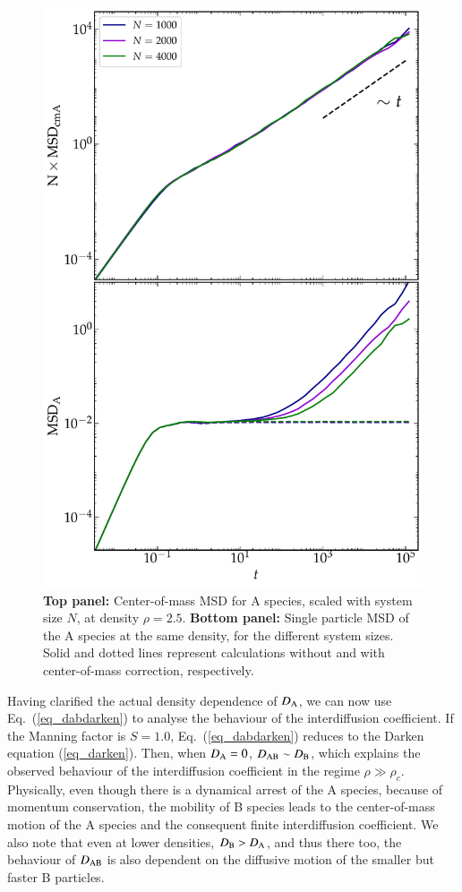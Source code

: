 %
\begin{figure}
\centering
\includegraphics[width=13cm]{figs/fig6p7.pdf}
\caption[{\em Center-of-mass MSD for A species, scaled with system size and single particle MSD of the A species at the same density, for the different system sizes}]{{\bf Top panel:} Center-of-mass MSD for A species, scaled with system size $N$, at density $\rho=2.5$. {\bf Bottom panel:}  Single particle MSD of the A species at the same density, for the different system sizes. Solid and dotted lines represent calculations without and with center-of-mass correction, respectively.
\label{fig6p7}}
\end{figure}
%

Having clarified the actual density dependence of $D_{\rm A}$, we can now use Eq.~(\ref{eq_dabdarken}) to analyse the behaviour of the interdiffusion coefficient. If the Manning factor is $S=1.0$, Eq.~(\ref{eq_dabdarken}) reduces to the Darken equation (\ref{eq_darken}). Then, when $D_{\rm A}=0$, $D_{\rm AB} \sim D_{\rm B}$, which explains the observed behaviour of the interdiffusion coefficient in the regime $\rho \gg \rho_c$.  Physically, even though there is a dynamical arrest of the A species, because of momentum conservation, the mobility of B species leads to the center-of-mass motion of the A species and the consequent finite interdiffusion coefficient. We also note that even at lower densities, $D_{\rm B} > D_{\rm A}$, and thus there too, the behaviour of $D_{\rm AB}$ is also dependent on the diffusive motion of the smaller but faster B particles.

